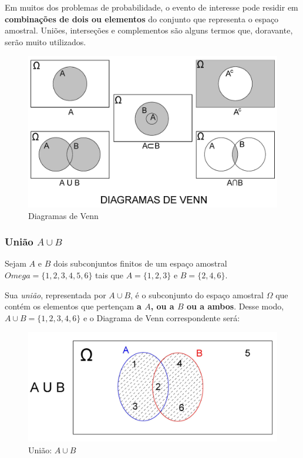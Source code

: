 \documentclass[
]{book}
\begin{document}
Em muitos dos problemas de probabilidade, o evento de interesse pode residir em \textbf{combinações de dois ou elementos} do conjunto que representa o espaço amostral. Uniões, interseções e complementos são alguns termos que, doravante, serão muito utilizados.

\hfill\break

\begin{figure}

{\centering \includegraphics[width=0.8\linewidth]{images4/venn} 

}

\caption{Diagramas de Venn}\label{fig:unnamed-chunk-50}
\end{figure}

\hfill\break

\hypertarget{uniuxe3o-a-cup-b}{%
\subsubsection{\texorpdfstring{União \(A \cup B\)}{União A \textbackslash cup B}}\label{uniuxe3o-a-cup-b}}

Sejam \(A\) e \(B\) dois subconjuntos finitos de um espaço amostral \(Omega=\{1,2,3,4,5,6\}\) tais que \(A=\{1,2,3\}\) e \(B=\{2,4,6\}\).

\hfill\break

Sua \emph{união}, representada por \(A \cup B\), é o subconjunto do espaço amostral \(\Omega\) que contém os elementos que pertençam \textbf{a \(A\), ou a \(B\) ou a ambos}. Desse modo, \(A \cup B =\{1,2,3,4,6\}\) e o Diagrama de Venn correspondente será:

\hfill\break

\begin{figure}

{\centering \includegraphics[width=0.8\linewidth]{images4/A_UN_B} 

}

\caption{União: $A \cup B$}\label{fig:unnamed-chunk-51}
\end{figure}
\end{document}

